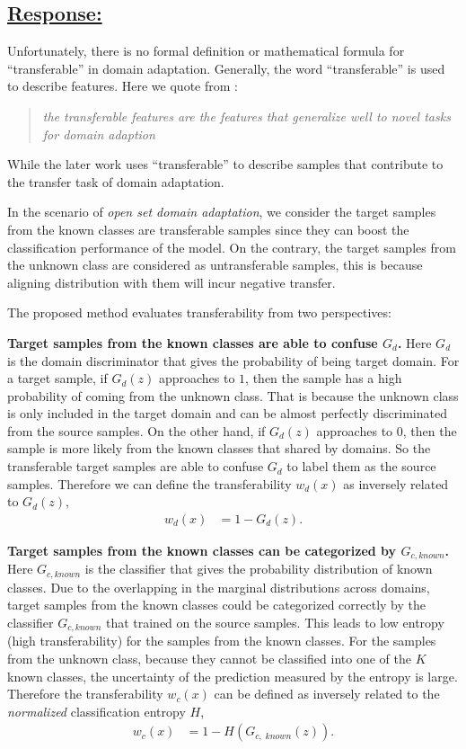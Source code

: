 \subsection*{\underline{\textbf{Response:}}}

Unfortunately, there is no formal definition or mathematical formula for ``transferable'' in domain adaptation.
Generally, the word ``transferable'' is used to describe features.
Here we quote from \cite{DeepAdaptationNetworks}:
\begin{quote}
    \textit{the transferable features are the features that generalize well to novel tasks for domain adaption}
\end{quote}
While the later work \cite{TransferableAttentionDA} uses ``transferable'' to describe samples that contribute to the transfer task of domain adaptation.

In the scenario of \textit{open set domain adaptation}, we consider the target samples from the known classes are transferable samples since they can boost the classification performance of the model.
On the contrary, the target samples from the unknown class are considered as untransferable samples, this is because aligning distribution with them will incur negative transfer.

The proposed method evaluates transferability from two perspectives:

\textbf{Target samples from the known classes are able to confuse $G_d$.}
Here $G_d$ is the domain discriminator that gives the probability of being target domain.
For a target sample, if $G_d(z)$ approaches to $1$, then the sample has a high probability of coming from the unknown class.
That is because the unknown class is only included in the target domain and can be almost perfectly discriminated from the source samples.
On the other hand, if $G_d(z)$ approaches to $0$, then the sample is more likely from the known classes that shared by domains.
So the transferable target samples are able to confuse $G_d$ to label them as the source samples.
Therefore we can define the transferability $w_d(x)$ as inversely related to $G_d(z)$,
\begin{align}
    w_d(x) &= 1-G_d(z). \label{eq: domain transferability}
\end{align}

\textbf{Target samples from the known classes can be categorized by $G_{c, known}$.}
Here $G_{c, known}$ is the classifier that gives the probability distribution of known classes.
Due to the overlapping in the marginal distributions across domains, target samples from the known classes could be categorized correctly by the classifier $G_{c, known}$ that trained on the source samples.
This leads to low entropy (high transferability) for the samples from the known classes.
For the samples from the unknown class, because they cannot be classified into one of the $K$ known classes, the uncertainty of the prediction measured by the entropy is large.
Therefore the transferability $w_c(x)$ can be defined as inversely related to the \textit{normalized} classification entropy $H$,
\begin{align}
    w_c(x) &=1-H(G_{c,\; known}(z)). \label{eq: class transferability}
\end{align}

